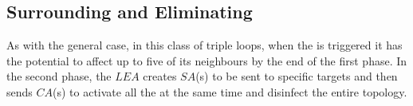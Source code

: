 \subsection{Surrounding and Eliminating}

As with the general case, in this class of triple loops, when the \bv is triggered it has the potential to affect up to five of its  neighbours by the end of the first phase. In the second phase, the $LEA$ creates $SA$(s) to be sent to specific targets and then sends $CA$(s) to activate all the \bvs at the same time and disinfect the entire topology.

